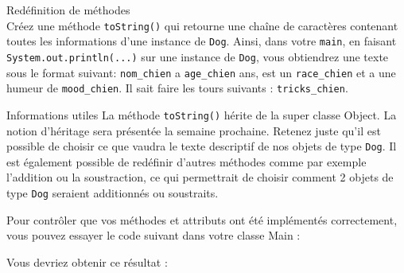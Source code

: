 \begin{Exercice}[5 minutes] Redéfinition de méthodes\\
    Créez une méthode \lstinline{toString()} qui retourne une chaîne de caractères contenant toutes les informations d'une instance de \lstinline{Dog}. Ainsi, dans votre \lstinline{main}, en faisant \lstinline{System.out.println(...)} sur une instance de \lstinline{Dog}, vous obtiendrez une texte sous le format suivant: 
    \lstinline{nom_chien} a \lstinline{age_chien} ans, est un \lstinline{race_chien} et a une humeur de \lstinline{mood_chien}. Il sait faire les tours suivants : \lstinline{tricks_chien}.

    \begin{Example}{\faLightbulb \quad Informations utiles}
        La méthode \lstinline{toString()} hérite de la super classe Object. La notion d'héritage sera présentée la semaine prochaine. Retenez juste qu'il est possible de choisir ce que vaudra le texte descriptif de nos objets de type \lstinline{Dog}. Il est également possible de redéfinir d'autres méthodes comme par exemple l'addition ou la soustraction, ce qui permettrait de choisir comment 2 objets de type \lstinline{Dog} seraient additionnés ou soustraits. \\
    \end{Example}

    \begin{solution}
        
    \end{solution}
\end{Exercice}

Pour contrôler que vos méthodes et attributs ont été implémentés correctement, vous pouvez essayer le code suivant dans votre classe Main :

	
	
Vous devriez obtenir ce résultat :
    

\newpage

